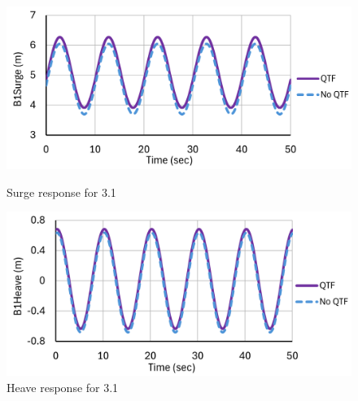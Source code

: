 \documentclass[a4paper, 11pt]{article}
\begin{document}
\begin{figure}[H]
    \begin{minipage}{0.48\textwidth}
        \centering
        \includegraphics[width=1\textwidth]{3.1_surge.png}
        \caption{\small Surge response for 3.1}
        \label{fig:3.1_surge}
    \end{minipage}
    \hfill
    \begin{minipage}{0.48\textwidth}
        \centering
        \includegraphics[width=1\textwidth]{3.1_heave.png}
        \caption{\small Heave response for 3.1}
        \label{fig:3.1_heave}
    \end{minipage}
\end{figure}
\end{document}
